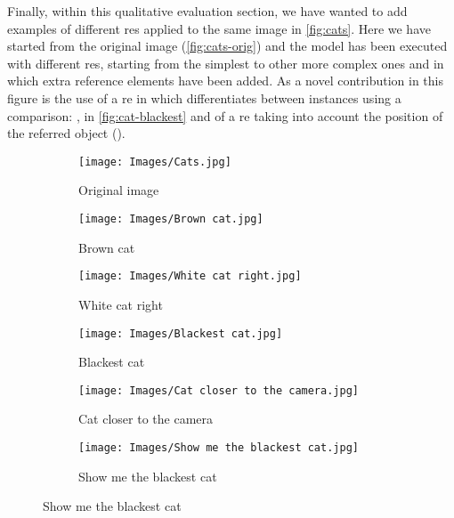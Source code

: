 Finally, within this qualitative evaluation section, we have wanted to add
examples of different \glspl{re} applied to the same image in
\vref{fig:cats}. Here we have started from the original image
(\vref{fig:cats-orig}) and the model has been executed with different
\glspl{re}, starting from the simplest to other more complex ones and in which
extra reference elements have been added. As a novel contribution in this
figure is the use of a \gls{re} in which differentiates between instances using
a comparison: , in \vref{fig:cat-blackest} and of a \gls{re}
taking into account the position of the referred object ().

\begin{figure}[p]
  \centering
  \begin{subfigure}[t]{.3\textwidth}
    \centering
    \caption{Original image}\label{fig:cats-orig}
    \texttt{[image: Images/Cats.jpg]}
  \end{subfigure}\hfill
  \begin{subfigure}[t]{.3\textwidth}
    \centering
    \caption{Brown cat}
    \texttt{[image: Images/Brown cat.jpg]}
  \end{subfigure}\hfill
  \begin{subfigure}[t]{.3\textwidth}
    \centering
    \caption{White cat right}
    \texttt{[image: Images/White cat right.jpg]}
  \end{subfigure}

  \bigskip
  \begin{subfigure}[t]{.3\textwidth}
    \centering
    \caption{Blackest cat}\label{fig:cat-blackest}
    \texttt{[image: Images/Blackest cat.jpg]}
  \end{subfigure}\hfill
  \begin{subfigure}[t]{.3\textwidth}
    \centering
    \caption{Cat closer to the camera}
    \texttt{[image: Images/Cat closer to the camera.jpg]}
  \end{subfigure}\hfill
  \begin{subfigure}[t]{.3\textwidth}
    \centering
    \caption{Show me the blackest cat}
    \texttt{[image: Images/Show me the blackest cat.jpg]}
  \end{subfigure}


\end{figure}
